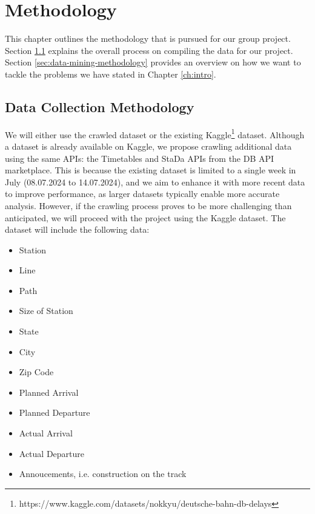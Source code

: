 \documentclass[a4paper,oneside,bibliography=totoc]{scrbook}
\begin{document}
\chapter{Methodology}
\label{ch:methodology}
This chapter outlines the methodology that is pursued for our group project. Section \ref{sec:dataset} explains the overall process on compiling the data for our project. Section \ref{sec:data-mining-methodology} provides an overview on how we want to tackle the problems we have stated in Chapter \ref{ch:intro}.

\section{Data Collection Methodology}\label{sec:dataset}
We will either use the crawled dataset or the existing Kaggle\footnote{https://www.kaggle.com/datasets/nokkyu/deutsche-bahn-db-delays} dataset. Although a dataset is already available on Kaggle, we propose crawling additional data using the same APIs: the Timetables and StaDa APIs from the DB API marketplace. This is because the existing dataset is limited to a single week in July (08.07.2024 to 14.07.2024), and we aim to enhance it with more recent data to improve performance, as larger datasets typically enable more accurate analysis. However, if the crawling process proves to be more challenging than anticipated, we will proceed with the project using the Kaggle dataset.
The dataset will include the following data:
\begin{itemize}
    \item Station
    \item Line
    \item Path
    \item Size of Station
    \item State
    \item City
    \item Zip Code
    \item Planned Arrival
    \item Planned Departure
    \item Actual Arrival
    \item Actual Departure
    \item Annoucements, i.e. construction on the track
\end{itemize}
\end{document}
